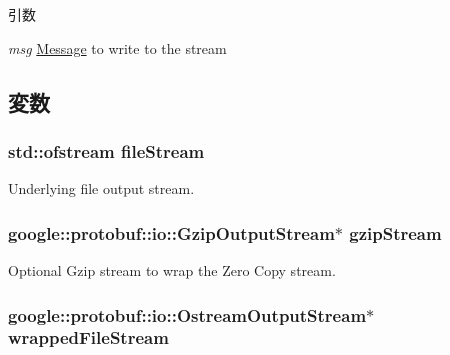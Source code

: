 \begin{DoxyParams}{引数}
\item[{\em msg}]\hyperlink{classMessage}{Message} to write to the stream \end{DoxyParams}


\subsection{変数}
\hypertarget{classProtoOutputStream_a028bd7a7284a793accbd103bba2eaa23}{
\subsubsection[{fileStream}]{\setlength{\rightskip}{0pt plus 5cm}std::ofstream {\bf fileStream}}}
\label{classProtoOutputStream_a028bd7a7284a793accbd103bba2eaa23}


Underlying file output stream. \hypertarget{classProtoOutputStream_a98a9278e366c43618c04c25c77e73c4e}{
\subsubsection[{gzipStream}]{\setlength{\rightskip}{0pt plus 5cm}google::protobuf::io::GzipOutputStream$\ast$ {\bf gzipStream}}}
\label{classProtoOutputStream_a98a9278e366c43618c04c25c77e73c4e}


Optional Gzip stream to wrap the Zero Copy stream. \hypertarget{classProtoOutputStream_ac29615f2f31f335197bcebbc248807aa}{
\subsubsection[{wrappedFileStream}]{\setlength{\rightskip}{0pt plus 5cm}google::protobuf::io::OstreamOutputStream$\ast$ {\bf wrappedFileStream}}}
\label{classProtoOutputStream_ac29615f2f31f335197bcebbc248807aa}


